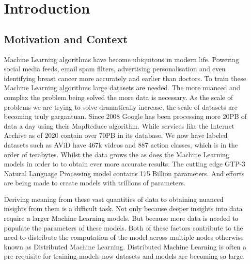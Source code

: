 
\section{Introduction}

\subsection{Motivation and Context}
Machine Learning algorithms have become ubiquitous in modern life. Powering
social media feeds, email spam filters, advertising personalisation and even
identifying breast cancer more accurately and earlier than doctors.
\cite{Mammograms2020} To train these Machine Learning algorithms large datasets
are needed. The more nuanced and complex the problem being solved the more data
is necessary. As the scale of problems we are trying to solve dramatically
increase, the scale of datasets are becoming truly gargantuan. Since 2008 Google
has been processing more 20PB of data a day using their MapReduce algorithm.
\cite{googlemapreduce2008} While services like the Internet Archive as of 2020
contain over 70PB in its database. We now have labeled datasets such as AViD
have 467k videos and 887 action classes, which is in the order of terabytes.
\cite{piergiovanni2020avid} 
Whilst the data grows the as does the Machine Learning models in order to to
obtain ever more accurate results. The cutting edge GTP-3 Natural Language
Processing model contains 175 Billion parameters. \cite{fewshowlearners2020gpt}
And efforts are being made to create models with trillions of parameters.
\cite{rajbhandari2020zero}
\par

Deriving meaning from these vast quantities of data to obtaining nuanced
insights from them is a difficult task. Not only because deeper insights into
data require a larger Machine Learning models. But because more data is needed
to populate the parameters of these models. Both of these factors contribute to
the need to distribute the computation of the model across multiple nodes
otherwise known as Distributed Machine Learning. Distributed Machine Learning is
often a pre-requisite for training models now datasets and models are becoming
so large. \cite{ParameterServers}
\par

